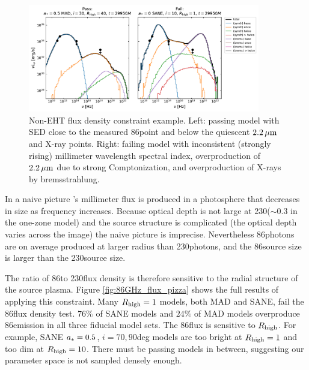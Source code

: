 \begin{figure}
  \centering
  \includegraphics[width=0.9\textwidth]{figures/passfail_sed.pdf}
  \caption{
    Non-EHT flux density constraint example.
    Left: passing model with SED close to the measured 86\GHz point and below the quiescent $2.2\,\mu\mathrm{m}$ and X-ray points.
    Right: failing model with inconsistent (strongly rising) millimeter wavelength spectral index, overproduction of $2.2\,\mu\mathrm{m}$ due to strong Comptonization, and overproduction of X-rays by bremsstrahlung.
  }
  \label{fig:passfail_sed}
\end{figure}


In a naive picture \sgra's millimeter flux is produced in a photosphere that decreases in size as frequency increases.
Because optical depth is not large at 230\GHz ($\sim 0.3$ in the one-zone model) and the source structure is complicated (the optical depth varies across the image) the naive picture is imprecise.
Nevertheless 86\GHz photons are on average produced at larger radius than 230\GHz photons, and the 86\GHz source size is larger than the 230\GHz source size.

The ratio of 86\GHz to 230\GHz flux density is therefore sensitive to the radial structure of the source plasma.
Figure \ref{fig:86GHz_flux_pizza} shows the full results of applying this constraint.
Many $R_\mathrm{high} = 1$ models, both MAD and SANE, fail the 86\GHz flux density test.
$76\%$ of SANE models and $24\%$ of MAD models overproduce 86\GHz emission in all three fiducial model sets.
The 86\GHz flux is sensitive to $R_\mathrm{high}$.
For example, SANE $a_* = 0.5$, $i = 70,90$deg models are too bright at $R_\mathrm{high} = 1$ and too dim at $R_\mathrm{high} = 10$.
There must be passing models in between, suggesting our parameter space is not sampled densely enough.


